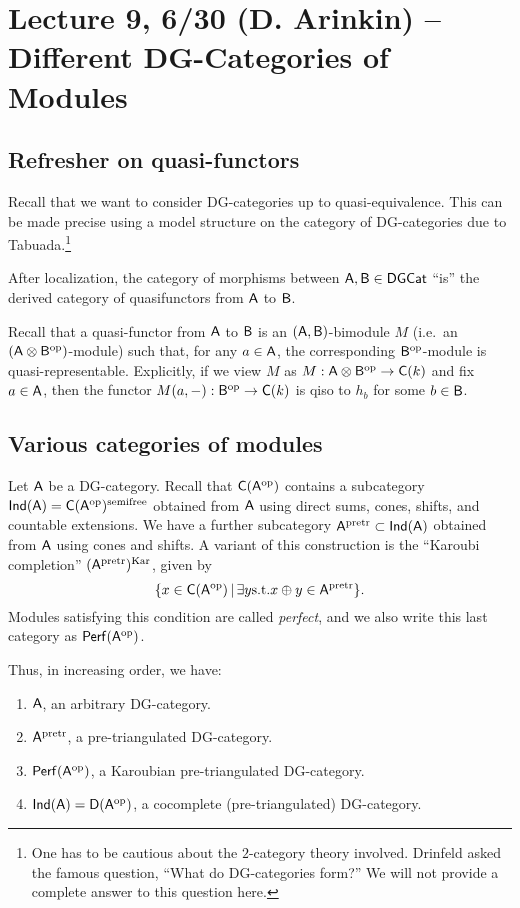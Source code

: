 \documentclass{amsart}
\begin{document}
\section{Lecture 9, 6/30 (D. Arinkin) -- Different DG-Categories of Modules}

\subsection{Refresher on quasi-functors}

Recall that we want to consider DG-categories up to quasi-equivalence.
This can be made precise using a model structure on the category of DG-categories due to Tabuada.\footnote{One has to be cautious about the $2$-category theory involved.
Drinfeld asked the famous question, ``What do DG-categories form?''
We will not provide a complete answer to this question here.}

\begin{thm}[To\"en]
	After localization, the category of morphisms between $\mathsf{A}, \mathsf{B} \in \mathsf{DGCat}$ ``is'' the derived category of quasifunctors from $\mathsf{A}$ to $\mathsf{B}$.
\end{thm}

Recall that a quasi-functor from $\mathsf{A}$ to $\mathsf{B}$ is an $(\mathsf{A}, \mathsf{B})$-bimodule $M$ (i.e.\ an $(\mathsf{A} \otimes \mathsf{B}^{\mathrm{op}})$-module) such that, for any $a \in \mathsf{A}$, the corresponding $\mathsf{B}^{\mathrm{op}}$-module is quasi-representable.
Explicitly, if we view $M$ as $M: \mathsf{A} \otimes \mathsf{B}^{\mathrm{op}} \to \mathsf{C}(k)$ and fix $a \in \mathsf{A}$, then the functor $M(a, -): \mathsf{B}^{\mathrm{op}} \to \mathsf{C}(k)$ is qiso to $h_b$ for some $b \in \mathsf{B}$.

\subsection{Various categories of modules}

Let $\mathsf{A}$ be a DG-category.
Recall that $\mathsf{C}(\mathsf{A}^{\mathrm{op}})$ contains a subcategory $\mathsf{Ind}(\mathsf{A}) = \mathsf{C}(\mathsf{A}^{\mathrm{op}})^{\mathrm{semifree}}$ obtained from $\mathsf{A}$ using direct sums, cones, shifts, and countable extensions.
We have a further subcategory $\mathsf{A}^{\mathrm{pretr}} \subset \mathsf{Ind}(\mathsf{A})$ obtained from $\mathsf{A}$ using cones and shifts.
A variant of this construction is the ``Karoubi completion'' $(\mathsf{A}^{\mathrm{pretr}})^{\mathrm{Kar}}$, given by
\[
	\{ x \in \mathsf{C}(\mathsf{A}^{\mathrm{op}}) \, | \, \exists y \textrm{s.t.} x \oplus y \in \mathsf{A}^{\mathrm{pretr}} \}.
\]
Modules satisfying this condition are called \emph{perfect}, and we also write this last category as $\mathsf{Perf}(\mathsf{A}^{\mathrm{op}})$.

Thus, in increasing order, we have:
\begin{enumerate}
	\item $\mathsf{A}$, an arbitrary DG-category.
	\item $\mathsf{A}^{\mathrm{pretr}}$, a pre-triangulated DG-category.
	\item $\mathsf{Perf}(\mathsf{A}^{\mathrm{op}})$, a Karoubian pre-triangulated DG-category.
	\item $\mathsf{Ind}(\mathsf{A}) = \mathsf{D}(\mathsf{A}^{\mathrm{op}})$, a cocomplete (pre-triangulated) DG-category.
\end{enumerate}
\end{document}
